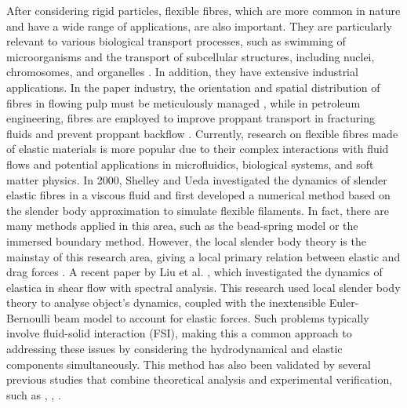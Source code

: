 \documentclass[12pt,MSc,twoside]{muthesis_2020}
\begin{document}
After considering rigid particles, flexible fibres, which are more common in nature and have a wide range of applications, are also important. They are particularly relevant to various biological transport processes, such as swimming of microorganisms \cite{lauga2009hydrodynamics} and the transport of subcellular structures, including nuclei, chromosomes, and organelles \cite{shelley2016dynamics}. In addition, they have extensive industrial applications. In the paper industry, the orientation and spatial distribution of fibres in flowing pulp must be meticulously managed \cite{yasuda2004experimental}, while in petroleum engineering, fibres are employed to improve proppant transport in fracturing fluids and prevent proppant backflow \cite{howard1995fiber}. Currently, research on flexible fibres made of elastic materials is more popular due to their complex interactions with fluid flows and potential applications in microfluidics, biological systems, and soft matter physics. In 2000, Shelley and Ueda \cite{shelley2000stokesian} investigated the dynamics of slender elastic fibres in a viscous fluid and first developed a numerical method based on the slender body approximation to simulate flexible filaments. In fact, there are many methods applied in this area, such as the bead-spring model or the immersed boundary method. However, the local slender body theory is the mainstay of this research area, giving a local primary relation between elastic and drag forces \cite{lindner2015elastic}. A recent paper by Liu et al. \cite{liu2024spectral}, which investigated the dynamics of elastica in shear flow with spectral analysis. This research used local slender body theory to analyse object's dynamics, coupled with the inextensible Euler-Bernoulli beam model to account for elastic forces. Such problems typically involve fluid-solid interaction (FSI), making this a common approach to addressing these issues by considering the hydrodynamical and elastic components simultaneously. This method has also been validated by several previous studies that combine theoretical analysis and experimental verification, such as \cite{tornberg2004simulating}, \cite{quennouz2015transport}, \cite{liu2018morphological}.
\end{document}
